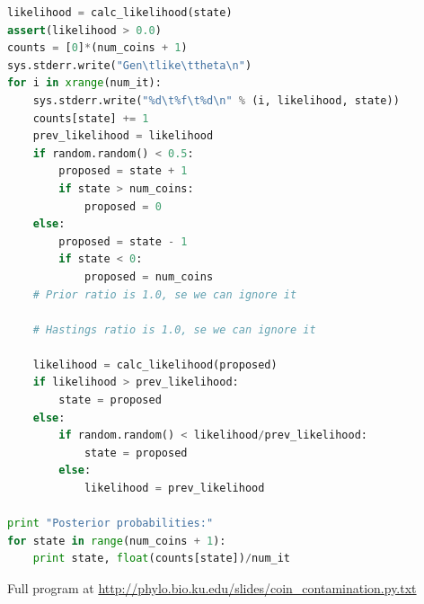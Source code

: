 \documentclass[11pt]{article}
\begin{document}
\begin{lstlisting}[frame=single,language=Python,columns=fixed,upquote=false,showstringspaces=false]
likelihood = calc_likelihood(state)
assert(likelihood > 0.0)
counts = [0]*(num_coins + 1)
sys.stderr.write("Gen\tlike\ttheta\n")
for i in xrange(num_it):
    sys.stderr.write("%d\t%f\t%d\n" % (i, likelihood, state))
    counts[state] += 1
    prev_likelihood = likelihood
    if random.random() < 0.5:
        proposed = state + 1
        if state > num_coins:
            proposed = 0
    else:
        proposed = state - 1
        if state < 0:
            proposed = num_coins
	# Prior ratio is 1.0, se we can ignore it
	
	# Hastings ratio is 1.0, se we can ignore it
	
    likelihood = calc_likelihood(proposed)
    if likelihood > prev_likelihood:
        state = proposed
    else:
        if random.random() < likelihood/prev_likelihood:
            state = proposed
        else:
            likelihood = prev_likelihood
            
print "Posterior probabilities:"
for state in range(num_coins + 1):
    print state, float(counts[state])/num_it
\end{lstlisting}
Full program at \url{http://phylo.bio.ku.edu/slides/coin_contamination.py.txt}

\newpage

\end{document}
